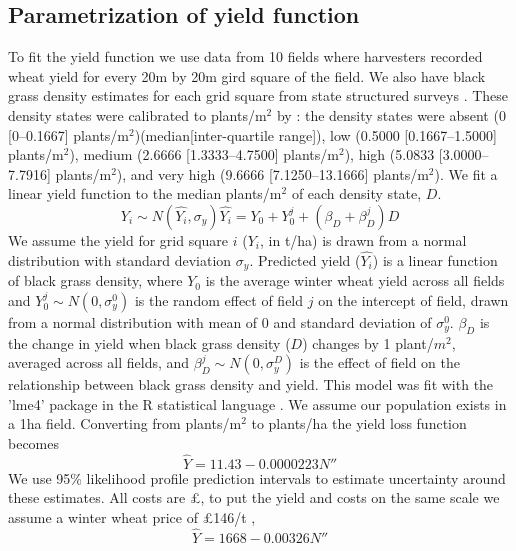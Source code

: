 \documentclass[12pt, a4paper]{article}
\begin{document}
\subsection{Parametrization of yield function} \label{Y_fun}
To fit the yield function we use data from 10 fields where harvesters recorded wheat yield for every 20m by 20m gird square of the field. We also have black grass density estimates for each grid square from state structured surveys \citep{Hick2018}. These density states were calibrated to plants/m$^2$ by \citet{Quee2011}: the density states were absent (0 [0--0.1667] plants/m$^2$)(median[inter-quartile range]), low (0.5000 [0.1667--1.5000] plants/m$^2$), medium (2.6666 [1.3333--4.7500] plants/m$^2$), high (5.0833 [3.0000--7.7916] plants/m$^2$), and very high (9.6666 [7.1250--13.1666] plants/m$^2$). We fit a linear yield function to the median plants/m$^2$ of each density state, $D$. 
\begin{subequations}
\label{eq:est_yield}
\begin{equation}
 Y_i \sim N(\widehat{Y_i}, \sigma_y)
\end{equation}
\begin{equation}
	\widehat{Y_i} = Y_0 + Y_0^j + (\beta_D + \beta_D^j)D 
\end{equation}
\end{subequations}
We assume the yield for grid square $i$ ($Y_i$, in t/ha) is drawn from a normal distribution with standard deviation $\sigma_y$. Predicted yield ($\widehat{Y_i}$) is a linear function of black grass density, where $Y_0$ is the average winter wheat yield across all fields and $Y_0^j \sim N(0, \sigma_y^0)$ is the random effect of field $j$ on the intercept of field, drawn from a normal distribution with mean of 0 and standard deviation of $\sigma_y^0$. $\beta_D$ is the change in yield when black grass density ($D$) changes by 1 plant/$m^2$, averaged across all fields, and $\beta_D^j \sim N(0, \sigma_y^D)$ is the effect of field on the relationship between black grass density and yield. This model was fit with the 'lme4' package \citep{Bate2015} in the R statistical language \citep{Rstat}. We assume our population exists in a 1ha field. Converting from plants/m$^2$ to plants/ha the yield loss function becomes 
\begin{equation}
	\widehat{Y} = 11.43 - 0.0000223 N'' 
\end{equation}
We use 95\% likelihood profile prediction intervals to estimate uncertainty around these estimates. All costs are \pounds, to put the yield and costs on the same scale we assume a winter wheat price of \pounds 146/t \citep{Nix2016}, 
\begin{equation}
	\widehat{Y} = 1668 - 0.00326 N'' 
\end{equation}


 
\end{document}
